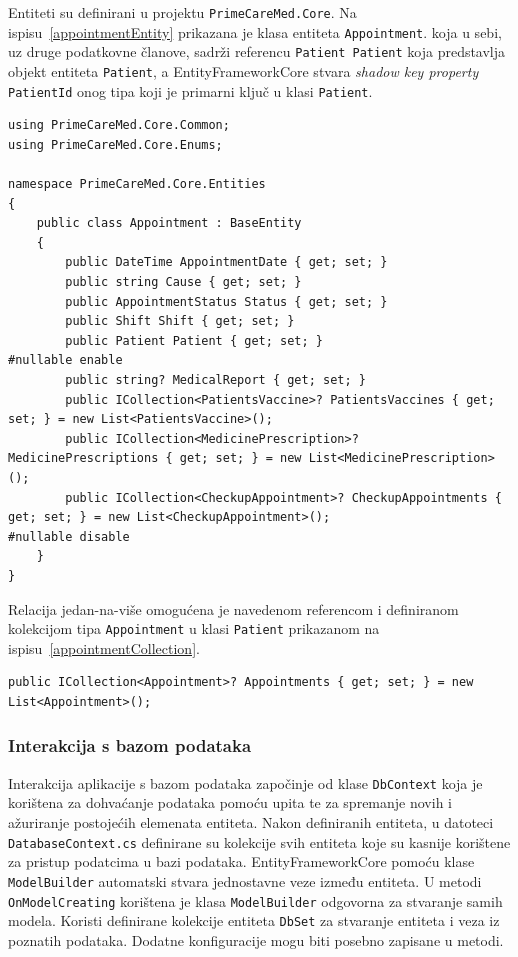 Entiteti su definirani u projektu \texttt{PrimeCareMed.Core}.
Na ispisu~\ref{appointmentEntity} prikazana je klasa entiteta \texttt{Appointment}. koja u sebi, uz druge podatkovne članove, sadrži referencu \texttt{Patient Patient} koja predstavlja objekt entiteta \texttt{Patient}, a EntityFrameworkCore stvara \textit{shadow key property} \texttt{PatientId} onog tipa koji je primarni ključ u klasi \texttt{Patient}. 
\begin{lstlisting}[caption={Entitet \texttt{Appointment}}, label=appointmentEntity]
using PrimeCareMed.Core.Common;
using PrimeCareMed.Core.Enums;

namespace PrimeCareMed.Core.Entities
{
    public class Appointment : BaseEntity
    {
        public DateTime AppointmentDate { get; set; }
        public string Cause { get; set; }
        public AppointmentStatus Status { get; set; }
        public Shift Shift { get; set; }
        public Patient Patient { get; set; }
#nullable enable
        public string? MedicalReport { get; set; }
        public ICollection<PatientsVaccine>? PatientsVaccines { get; set; } = new List<PatientsVaccine>();
        public ICollection<MedicinePrescription>? MedicinePrescriptions { get; set; } = new List<MedicinePrescription>();
        public ICollection<CheckupAppointment>? CheckupAppointments { get; set; } = new List<CheckupAppointment>();
#nullable disable
    }
}
\end{lstlisting}
Relacija jedan-na-više\cite{oneToMany} omogućena je navedenom referencom i definiranom kolekcijom tipa \texttt{Appointment} u klasi \texttt{Patient} prikazanom na ispisu~\ref{appointmentCollection}.
\begin{lstlisting}[caption={Kolekcija objekata \texttt{Appointment} u klasi Patient}, label=appointmentCollection]
public ICollection<Appointment>? Appointments { get; set; } = new List<Appointment>();
\end{lstlisting}

\subsubsection{Interakcija s bazom podataka}
Interakcija aplikacije s bazom podataka započinje od klase \texttt{DbContext} koja je korištena za dohvaćanje podataka pomoću upita te za spremanje novih i ažuriranje postojećih elemenata entiteta. Nakon definiranih entiteta, u datoteci \texttt{DatabaseContext.cs} definirane su kolekcije svih entiteta koje su kasnije korištene za pristup podatcima u bazi podataka. EntityFrameworkCore pomoću klase \texttt{ModelBuilder} automatski stvara jednostavne veze između entiteta. U metodi \texttt{OnModelCreating} korištena je klasa \texttt{ModelBuilder} odgovorna za stvaranje samih modela. Koristi definirane kolekcije entiteta \texttt{DbSet} za stvaranje entiteta i veza iz poznatih podataka. Dodatne konfiguracije mogu biti posebno zapisane u metodi.

